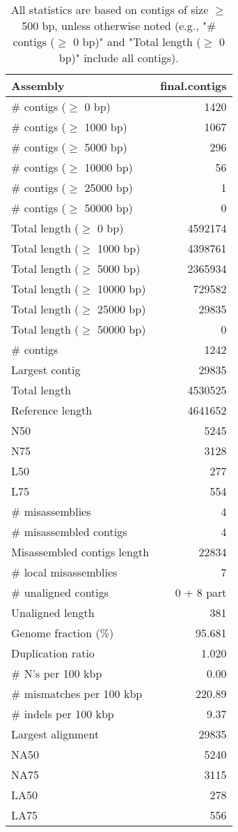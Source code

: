 \documentclass[12pt,a4paper]{article}
\begin{document}
\begin{table}[ht]
\begin{center}
\caption{All statistics are based on contigs of size $\geq$ 500 bp, unless otherwise noted (e.g., "\# contigs ($\geq$ 0 bp)" and "Total length ($\geq$ 0 bp)" include all contigs).}
\begin{tabular}{|l*{1}{|r}|}
\hline
Assembly & final.contigs \\ \hline
\# contigs ($\geq$ 0 bp) & 1420 \\ \hline
\# contigs ($\geq$ 1000 bp) & 1067 \\ \hline
\# contigs ($\geq$ 5000 bp) & 296 \\ \hline
\# contigs ($\geq$ 10000 bp) & 56 \\ \hline
\# contigs ($\geq$ 25000 bp) & 1 \\ \hline
\# contigs ($\geq$ 50000 bp) & 0 \\ \hline
Total length ($\geq$ 0 bp) & 4592174 \\ \hline
Total length ($\geq$ 1000 bp) & 4398761 \\ \hline
Total length ($\geq$ 5000 bp) & 2365934 \\ \hline
Total length ($\geq$ 10000 bp) & 729582 \\ \hline
Total length ($\geq$ 25000 bp) & 29835 \\ \hline
Total length ($\geq$ 50000 bp) & 0 \\ \hline
\# contigs & 1242 \\ \hline
Largest contig & 29835 \\ \hline
Total length & 4530525 \\ \hline
Reference length & 4641652 \\ \hline
N50 & 5245 \\ \hline
N75 & 3128 \\ \hline
L50 & 277 \\ \hline
L75 & 554 \\ \hline
\# misassemblies & 4 \\ \hline
\# misassembled contigs & 4 \\ \hline
Misassembled contigs length & 22834 \\ \hline
\# local misassemblies & 7 \\ \hline
\# unaligned contigs & 0 + 8 part \\ \hline
Unaligned length & 381 \\ \hline
Genome fraction (\%) & 95.681 \\ \hline
Duplication ratio & 1.020 \\ \hline
\# N's per 100 kbp & 0.00 \\ \hline
\# mismatches per 100 kbp & 220.89 \\ \hline
\# indels per 100 kbp & 9.37 \\ \hline
Largest alignment & 29835 \\ \hline
NA50 & 5240 \\ \hline
NA75 & 3115 \\ \hline
LA50 & 278 \\ \hline
LA75 & 556 \\ \hline
\end{tabular}
\end{center}
\end{table}
\end{document}
